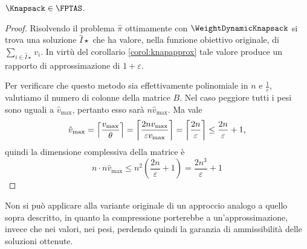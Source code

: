 \begin{theorem}
	$\Knapsack\in\FPTAS$.
\end{theorem}
\begin{proof}
	Risolvendo il problema $\hat\pi$ ottimamente con $\WeightDynamicKnapsack$ si trova una soluzione $\hat I\star$ che ha valore, nella funzione obiettivo originale, di $\sum_{i\in\hat I\star} v_i$. In virtù del corollario \ref{corol:knapapprox} tale valore produce un rapporto di approssimazione di $1+\varepsilon$.

	Per verificare che questo metodo sia effettivamente polinomiale in $n$ e $\frac{1}{\varepsilon}$, valutiamo il numero di colonne della matrice $B$.
	Nel caso peggiore tutti i pesi sono uguali a $\hat v_{\max}$, pertanto esso sarà $n \hat v_{\max}$.
	Ma vale
	\begin{equation*}
		\hat v_{\max}=\left\lceil \frac{v_{\max}}{\theta} \right\rceil=\left\lceil \frac{2nv_{\max}}{\varepsilon v_{\max}} \right\rceil=\left\lceil \frac{2n}{\varepsilon} \right\rceil\leq\frac{2n}{\varepsilon}+1 \text,
	\end{equation*}
	quindi la dimensione complessiva della matrice è
	\begin{equation*}
		n\cdot n\hat v_{\max}\leq n^2\left(\frac{2n}{\varepsilon}+1\right)=\frac{2n^3}{\varepsilon}+1
	\end{equation*}
\end{proof}

Non si può applicare alla variante originale di \DynamicKnapsack un approccio analogo a quello sopra descritto, in quanto la compressione porterebbe a un'approssimazione, invece che nei valori, nei pesi, perdendo quindi la garanzia di ammissibilità delle soluzioni ottenute.
